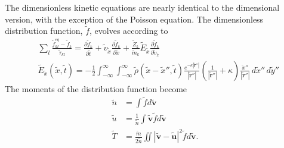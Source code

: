 \documentclass{article}
\begin{document}
The dimensionless kinetic equations are nearly identical to the dimensional version, with the exception of the Poisson equation. The dimensionless distribution function, $\tilde{f}$, evolves according to
\begin{align*}
&\sum_l\frac{\tilde{f}_{kl}^{eq}-\tilde{f}_k}{\tilde{\tau}_{kl}}=\frac{\partial \tilde{f}_k}{\partial \tilde{t}}+\tilde{v}_{\tilde{x}}\frac{\partial \tilde{f}_k}{\partial \tilde{x}}+\frac{\tilde{Z}_k}{\tilde{m}_k}\tilde{E}_{\tilde{x}}\frac{\partial \tilde{f}_k}{\partial \tilde{v}_{\tilde{x}}}\\
&\tilde{E}_{\tilde{x}}(\tilde{x},\tilde{t})=-\frac{1}{2}\int_{-\infty}^{\infty}\int_{-\infty}^{\infty}\tilde{\rho}(\tilde{x}-\tilde{x}'',\tilde{t})\frac{e^{-\kappa|\tilde{\mathbf{r}}''|}}{|\tilde{\mathbf{r}}''|}\left(\frac{1}{|\tilde{\mathbf{r}}''|}+\kappa\right)\frac{\tilde{x}''}{|\tilde{\mathbf{r}}''|}\,d\tilde{x}''\,d\tilde{y}''
\end{align*}
The moments of the distribution function become
\begin{align*}
\tilde{n} &= \int\tilde{f}d\tilde{\mathbf{v}} \\
\tilde{u} &= \frac{1}{\tilde{n}}\int\tilde{\mathbf{v}}\tilde{f}d\tilde{\mathbf{v}} \\
\tilde{T} &= \frac{\tilde{m}}{2\tilde{n}}\iint\left|\tilde{\mathbf{v}}-\tilde{\mathbf{u}}\right|^2\tilde{f}d\tilde{\mathbf{v}}.
\end{align*}
\end{document}
